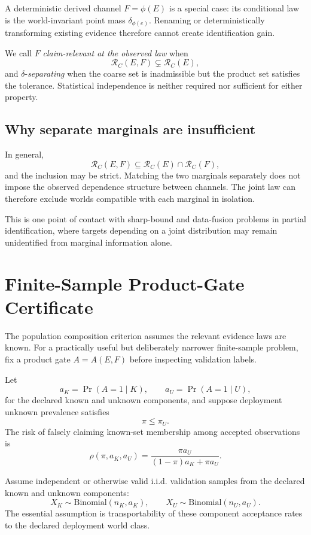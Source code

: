 \documentclass[11pt]{article}
\begin{document}
A deterministic derived channel $F=\phi(E)$ is a special case: its conditional
law is the world-invariant point mass $\delta_{\phi(e)}$. Renaming or
deterministically transforming existing evidence therefore cannot create
identification gain.

We call $F$ \emph{claim-relevant at the observed law} when
\[
\mathcal R_C(E,F)\subsetneq\mathcal R_C(E),
\]
and $\delta$-\emph{separating} when the coarse set is inadmissible but the
product set satisfies the tolerance. Statistical independence is neither
required nor sufficient for either property.

\subsection{Why separate marginals are insufficient}

In general,
\[
\mathcal R_C(E,F)
\subseteq
\mathcal R_C(E)\cap\mathcal R_C(F),
\]
and the inclusion may be strict. Matching the two marginals separately does
not impose the observed dependence structure between channels. The joint law
can therefore exclude worlds compatible with each marginal in isolation.

This is one point of contact with sharp-bound and data-fusion problems in
partial identification, where targets depending on a joint distribution may
remain unidentified from marginal information alone.

\section{Finite-Sample Product-Gate Certificate}
\label{sec:finite-composition}

The population composition criterion assumes the relevant evidence laws are
known. For a practically useful but deliberately narrower finite-sample
problem, fix a product gate $A=A(E,F)$ before inspecting validation labels.

Let
\[
a_K=\Pr(A=1\mid K),
\qquad
a_U=\Pr(A=1\mid U),
\]
for the declared known and unknown components, and suppose deployment unknown
prevalence satisfies
\[
\pi\le\pi_U.
\]
The risk of falsely claiming known-set membership among accepted observations is
\[
\rho(\pi,a_K,a_U)
=
\frac{\pi a_U}
{(1-\pi)a_K+\pi a_U}.
\]

Assume independent or otherwise valid i.i.d. validation samples from the
declared known and unknown components:
\[
X_K\sim\mathrm{Binomial}(n_K,a_K),
\qquad
X_U\sim\mathrm{Binomial}(n_U,a_U).
\]
The essential assumption is transportability of these component acceptance
rates to the declared deployment world class.
\end{document}
